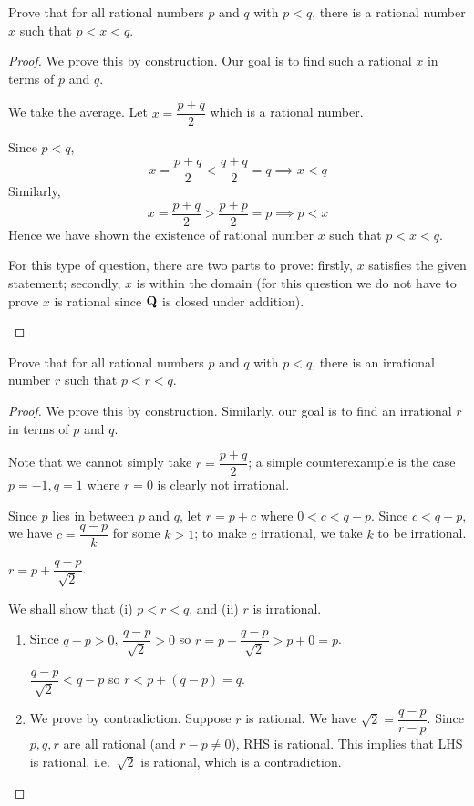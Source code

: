 \begin{exercise}
Prove that for all rational numbers $p$ and $q$ with $p<q$, there is a rational number $x$ such that $p<x<q$.
\end{exercise}
\begin{proof}
We prove this by construction. Our goal is to find such a rational $x$ in terms of $p$ and $q$.

We take the average. Let $x=\dfrac{p+q}{2}$ which is a rational number.

Since $p<q$, 
\[ x=\frac{p+q}{2}<\frac{q+q}{2}=q \implies x<q \]
Similarly,
\[ x=\frac{p+q}{2}>\frac{p+p}{2}=p \implies p<x \]
Hence we have shown the existence of rational number $x$ such that $p<x<q$.

\begin{remark}
For this type of question, there are two parts to prove: firstly, $x$ satisfies the given statement; secondly, $x$ is within the domain (for this question we do not have to prove $x$ is rational since $\mathbf Q$ is closed under addition).
\end{remark}
\end{proof}

\begin{exercise}
Prove that for all rational numbers $p$ and $q$ with $p<q$, there is an irrational number $r$ such that $p<r<q$.
\end{exercise}
\begin{proof}
We prove this by construction. Similarly, our goal is to find an irrational $r$ in terms of $p$ and $q$.

Note that we cannot simply take $r=\dfrac{p+q}{2}$; a simple counterexample is the case $p=-1,q=1$ where $r=0$ is clearly not irrational.

Since $p$ lies in between $p$ and $q$, let $r=p+c$ where $0<c<q-p$. Since $c<q-p$, we have $c=\dfrac{q-p}{k}$ for some $k>1$; to make $c$ irrational, we take $k$ to be irrational.

\begin{claim}
$r=p+\dfrac{q-p}{\sqrt{2}}$.
\end{claim}

We shall show that (i) $p<r<q$, and (ii) $r$ is irrational.
\begin{enumerate}[label=(\roman*)]
\item Since $q-p>0$, $\dfrac{q-p}{\sqrt{2}}>0$ so $r=p+\dfrac{q-p}{\sqrt{2}}>p+0=p$.

$\dfrac{q-p}{\sqrt{2}}<q-p$ so $r<p+(q-p)=q$.

\item We prove by contradiction. Suppose $r$ is rational. We have $\sqrt{2}=\dfrac{q-p}{r-p}$. Since $p,q,r$ are all rational (and $r-p\neq0$), RHS is rational. This implies that LHS is rational, i.e.\ $\sqrt{2}$ is rational, which is a contradiction.
\end{enumerate}
\end{proof}

